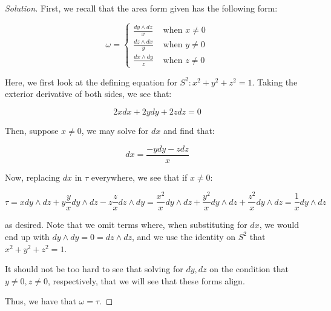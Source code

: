 \documentclass[10pt]{article}
\theoremstyle{nonumberplain}%
\begin{document}
\begin{proof}[Solution]

First, we recall that the area form given has the following form:

$$ \omega = \begin{cases} \frac{dy \wedge dz }{x} & \text{ when } x \not = 0 \\ \frac{dz \wedge dx }{y} & \text{ when } y \not = 0 \\  \frac{dx \wedge dy }{z} & \text{ when } z \not = 0\end{cases} $$

Here, we first look at the defining equation for $S^2: x^2 + y^2 + z^2 = 1$. Taking the exterior derivative of both sides, we see that:

$$ 2x dx + 2y dy + 2z dz = 0 $$

Then, suppose $x \not = 0$, we may solve for $dx$ and find that:

$$ dx = \frac{ -y dy - z dz}{x}$$

Now, replacing $dx$ in $\tau$ everywhere, we see that if $x \not = 0$:

$$ \tau =  x dy \wedge dz +y \frac{y}{x} dy \wedge dz - z \frac{z}{x} dz \wedge dy  = \frac{x^2}{x} dy \wedge dz + \frac{y^2}{x} dy \wedge dz + \frac{z^2}{x} dy \wedge dz = \frac{1}{x} dy \wedge dz $$

as desired. Note that we omit terms where, when substituting for $dx$, we would end up with $dy \wedge dy = 0 = dz \wedge dz$, and we use the identity on $S^2$ that $x^2 + y^2 + z^2 = 1$.

It should not be too hard to see that solving for $dy, dz$ on the condition that $y \not = 0, z \not = 0$, respectively, that we will see that these forms align.

Thus, we have that $\omega = \tau$. 

\end{proof}
\end{document}
